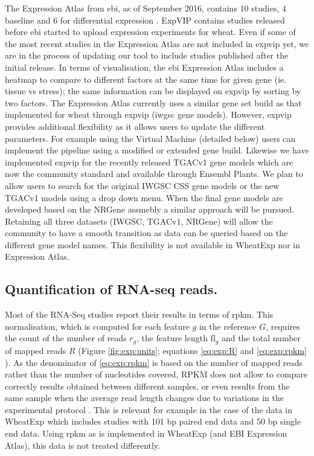The Expression Atlas from \gls{ebi}, as of September 2016, contains 10 studies, 4 baseline and 6 for differential expression \citep{Petryszak2016}. 
ExpVIP contains studies released before \acrshort{ebi} started to upload expression experiments for wheat. 
Even if some of the most recent studies in the Expression Atlas are not included in \gls{expvip} yet, we are in the process of updating our tool to include studies published after the initial release.
In terms of visualisation, the \gls{ebi} Expression Atlas includes a heatmap to compare to different factors at the same time for given gene (ie. tissue vs stress); the same information can be displayed on \gls{expvip} by sorting by two factors.
The Expression Atlas currently uses a similar gene set build as that implemented for wheat through \gls{expvip} (\acrshort{iwgsc} gene models). 
However, \gls{expvip} provides additional flexibility as it allows users to update the different parameters. 
For example using the Virtual Machine (detailed below) users can implement the pipeline using a modified or extended gene build. 
Likewise we have implemented \gls{expvip} for the recently released TGACv1 gene models which are now the community standard and available through Ensembl Plants. 
We plan to allow users to search for the original IWGSC CSS gene models or the new TGACv1 models using a drop down menu. 
When the final gene models are developed based on the NRGene assmebly a similar approach will be pursued. 
Retaining all three datasets (IWGSC, TGACv1, NRGene) will allow the community to have a smooth transition as data can be queried based on the different gene model names. 
This flexibility is not available in WheatExp nor in Expression Atlas. 

\subsection{Quantification of RNA-seq reads.}
Most of the RNA-Seq studies report their results in terms of \gls{rpkm}. 
This normalisation, which is computed for each feature $g$ in the reference $G$, requires the count of the number of reads  $r_{g}$, the feature length $\textrm{fl}_{g}$ and the total number of mapped reads $R$ (Figure \ref{fig:exp:units}; equations \ref{eq:exp:R} and  \ref{eq:exp:rpkm} \citealt{Mortazavi2008}).
As the denominator of \ref{eq:exp:rpkm} is based on the number of mapped reads rather than the number of nucleotides covered, RPKM does not allow to compare correctly results obtained between different samples, or even results from the same sample when the average read length changes due to variations in the experimental protocol \citep{Wagner2012}.
This is relevant for example in the case of the data in WheatExp which includes studies with 101 bp paired end data and 50 bp single end data. 
Using \gls{rpkm} as is implemented in WheatExp (and EBI Expression Atlas), this data is not treated differently.  

